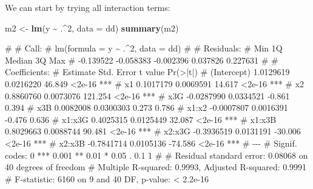 \documentclass[
  a4paper,
]{article}
\newenvironment{Shaded}{\begin{snugshade}}{\end{snugshade}}
\newcommand{\AttributeTok}[1]{\textcolor[rgb]{0.13,0.29,0.53}{#1}}
\newcommand{\DecValTok}[1]{\textcolor[rgb]{0.00,0.00,0.81}{#1}}
\newcommand{\FunctionTok}[1]{\textcolor[rgb]{0.13,0.29,0.53}{\textbf{#1}}}
\newcommand{\NormalTok}[1]{#1}
\newcommand{\OtherTok}[1]{\textcolor[rgb]{0.56,0.35,0.01}{#1}}
\newcommand{\SpecialCharTok}[1]{\textcolor[rgb]{0.81,0.36,0.00}{\textbf{#1}}}
\theoremstyle{definition}
\theoremstyle{definition}
\theoremstyle{definition}
\theoremstyle{definition}
\theoremstyle{remark}
\begin{document}
\begin{myanswers}
We can start by trying all interaction terms:

\begin{Shaded}
\begin{Highlighting}[]
\NormalTok{m2 }\OtherTok{\textless{}{-}} \FunctionTok{lm}\NormalTok{(y }\SpecialCharTok{\textasciitilde{}}\NormalTok{ .}\SpecialCharTok{\^{}}\DecValTok{2}\NormalTok{, }\AttributeTok{data =}\NormalTok{ dd)}
\FunctionTok{summary}\NormalTok{(m2)}
\end{Highlighting}
\end{Shaded}

\begin{Shaded}
\begin{Highlighting}[]
\NormalTok{\# }
\NormalTok{\# Call:}
\NormalTok{\# lm(formula = y \textasciitilde{} .\^{}2, data = dd)}
\NormalTok{\# }
\NormalTok{\# Residuals:}
\NormalTok{\#       Min        1Q    Median        3Q       Max }
\NormalTok{\# {-}0.139522 {-}0.058383 {-}0.002396  0.037826  0.227631 }
\NormalTok{\# }
\NormalTok{\# Coefficients:}
\NormalTok{\#               Estimate Std. Error t value Pr(\textgreater{}|t|)    }
\NormalTok{\# (Intercept)  1.0129619  0.0216220  46.849   \textless{}2e{-}16 ***}
\NormalTok{\# x1           0.1017179  0.0069591  14.617   \textless{}2e{-}16 ***}
\NormalTok{\# x2           0.8860760  0.0073076 121.254   \textless{}2e{-}16 ***}
\NormalTok{\# x3G         {-}0.0287990  0.0334521  {-}0.861    0.394    }
\NormalTok{\# x3B          0.0082008  0.0300303   0.273    0.786    }
\NormalTok{\# x1:x2       {-}0.0007807  0.0016391  {-}0.476    0.636    }
\NormalTok{\# x1:x3G       0.4025315  0.0125449  32.087   \textless{}2e{-}16 ***}
\NormalTok{\# x1:x3B       0.8029663  0.0088744  90.481   \textless{}2e{-}16 ***}
\NormalTok{\# x2:x3G      {-}0.3936519  0.0131191 {-}30.006   \textless{}2e{-}16 ***}
\NormalTok{\# x2:x3B      {-}0.7841714  0.0105136 {-}74.586   \textless{}2e{-}16 ***}
\NormalTok{\# {-}{-}{-}}
\NormalTok{\# Signif. codes:  0 \textquotesingle{}***\textquotesingle{} 0.001 \textquotesingle{}**\textquotesingle{} 0.01 \textquotesingle{}*\textquotesingle{} 0.05 \textquotesingle{}.\textquotesingle{} 0.1 \textquotesingle{} \textquotesingle{} 1}
\NormalTok{\# }
\NormalTok{\# Residual standard error: 0.08068 on 40 degrees of freedom}
\NormalTok{\# Multiple R{-}squared:  0.9993,  Adjusted R{-}squared:  0.9991 }
\NormalTok{\# F{-}statistic:  6160 on 9 and 40 DF,  p{-}value: \textless{} 2.2e{-}16}
\end{Highlighting}
\end{Shaded}


\end{myanswers}
\end{document}
